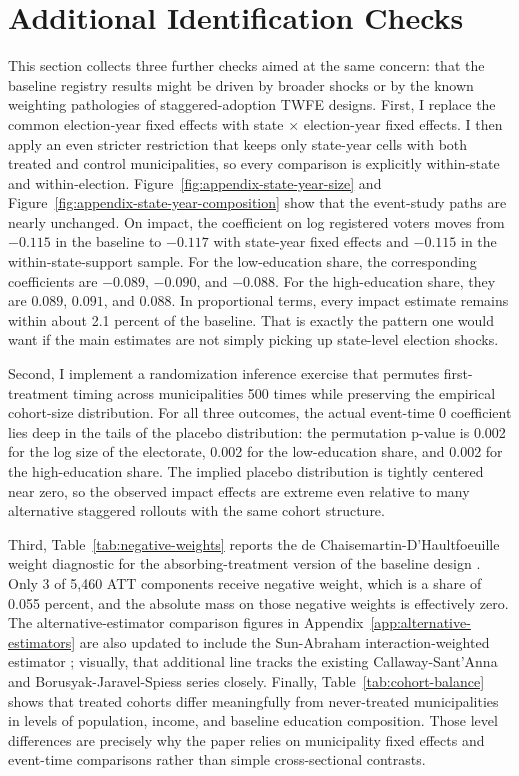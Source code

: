 \section{Additional Identification Checks}
\label{app:additional-robustness}

This section collects three further checks aimed at the same concern: that the baseline registry results might be driven by broader shocks or by the known weighting pathologies of staggered-adoption TWFE designs. First, I replace the common election-year fixed effects with state $\times$ election-year fixed effects. I then apply an even stricter restriction that keeps only state-year cells with both treated and control municipalities, so every comparison is explicitly within-state and within-election. Figure~\ref{fig:appendix-state-year-size} and Figure~\ref{fig:appendix-state-year-composition} show that the event-study paths are nearly unchanged. On impact, the coefficient on log registered voters moves from $-0.115$ in the baseline to $-0.117$ with state-year fixed effects and $-0.115$ in the within-state-support sample. For the low-education share, the corresponding coefficients are $-0.089$, $-0.090$, and $-0.088$. For the high-education share, they are $0.089$, $0.091$, and $0.088$. In proportional terms, every impact estimate remains within about 2.1 percent of the baseline. That is exactly the pattern one would want if the main estimates are not simply picking up state-level election shocks.

Second, I implement a randomization inference exercise that permutes first-treatment timing across municipalities 500 times while preserving the empirical cohort-size distribution. For all three outcomes, the actual event-time $0$ coefficient lies deep in the tails of the placebo distribution: the permutation p-value is 0.002 for the log size of the electorate, 0.002 for the low-education share, and 0.002 for the high-education share. The implied placebo distribution is tightly centered near zero, so the observed impact effects are extreme even relative to many alternative staggered rollouts with the same cohort structure.

Third, Table~\ref{tab:negative-weights} reports the de Chaisemartin-D'Haultfoeuille weight diagnostic for the absorbing-treatment version of the baseline design \citep{deChaisemartin2020TwoWayFixed}. Only 3 of 5{,}460 ATT components receive negative weight, which is a share of 0.055 percent, and the absolute mass on those negative weights is effectively zero. The alternative-estimator comparison figures in Appendix~\ref{app:alternative-estimators} are also updated to include the Sun-Abraham interaction-weighted estimator \citep{Abraham2018EstimatiDynamicTreatmen}; visually, that additional line tracks the existing Callaway-Sant'Anna and Borusyak-Jaravel-Spiess series closely. Finally, Table~\ref{tab:cohort-balance} shows that treated cohorts differ meaningfully from never-treated municipalities in levels of population, income, and baseline education composition. Those level differences are precisely why the paper relies on municipality fixed effects and event-time comparisons rather than simple cross-sectional contrasts.

